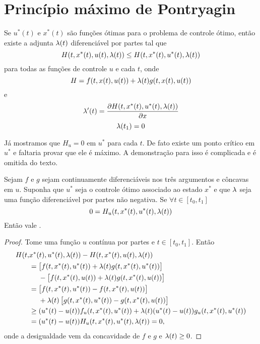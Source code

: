 \section{Princípio máximo de Pontryagin}
\label{pontryagin}

\begin{theorem}
    Se $u^*(t)$ e $x^*(t)$ são funções ótimas para o problema de controle
    ótimo, então existe a adjunta $\lambda(t)$ diferenciável por partes tal que 
    \begin{equation}
        \label{inequality-hamiltonian}
        H(t, x^*(t), u(t), \lambda(t)) \le H(t, x^*(t), u^*(t), \lambda(t))
    \end{equation}    
    para todas as funções de controle $u$ e cada $t$, onde 
    $$
    H = f(t, x(t), u(t)) + \lambda(t)g(t, x(t), u(t))
    $$
    e
    $$
    \lambda '(t) = \dfrac{\partial H(t, x^*(t), u^*(t), \lambda (t))}{\partial x} 
    $$
    $$
    \lambda(t_1) = 0
    $$
\end{theorem}  

Já mostramos que $H_u = 0$ em $u^*$ para cada $t$. De fato existe um ponto
crítico em $u^*$ e faltaria provar que ele é máximo. A demonstração para isso
é complicada e é omitida do texto. 

\begin{theorem}
    \label{theorem-inequality}
    Sejam $f$ e $g$ sejam continuamente diferenciáveis nos três
    argumentos e côncavas em $u$. Suponha que $u^*$ seja o controle ótimo
    associado ao estado $x^*$ e que $\lambda$ seja uma função diferenciável por
    partes não negativa. Se $\forall t \in [t_0, t_1]$
    $$
    0 = H_u(t, x^*(t), u^*(t), \lambda(t))
    $$
    Então vale .
\end{theorem}

\begin{proof}
    Tome uma função $u$ contínua por partes e $t \in [t_0, t_1]$. Então 
    \begin{equation*}
        \begin{split}
            H(t, &x^*(t), u^*(t), \lambda(t)) - H(t, x^*(t), u(t), \lambda(t))  \\ 
            &= \left[f(t,x^*(t), u^*(t)) + \lambda(t)g(t,x^*(t), u^*(t))\right] \\
            &~~~~- \left[f(t,x^*(t), u(t)) + \lambda(t)g(t,x^*(t), u(t))\right] \\ 
            &= \left[f(t,x^*(t), u^*(t)) - f(t,x^*(t), u(t)) \right] \\
            &~~~~+ \lambda(t)\left[g(t,x^*(t), u^*(t)) - g(t,x^*(t), u(t))\right] \\
            &\ge (u^*(t) - u(t))f_u(t,x^*(t), u^*(t)) + \lambda(t)(u^*(t) - u(t))g_u(t,x^*(t),u^*(t)) \\ 
            &= (u^*(t) - u(t))H_u(t,x^*(t), u^*(t),\lambda(t)) = 0,
        \end{split}
    \end{equation*}
    onde a desigualdade vem da concavidade de $f$ e $g$ e $\lambda(t) \ge 0$. 
\end{proof}

